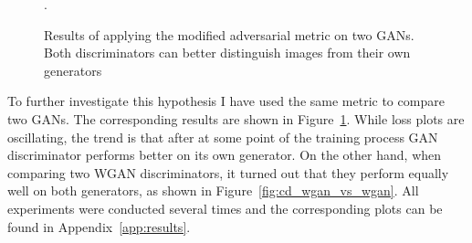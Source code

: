 \begin{figure}[h!]
\begin{subfigure}[b]{0.5\textwidth}
	\end{subfigure}
	\caption{Results of applying the modified adversarial metric on two GANs. Both discriminators can better distinguish images from their own generators}.
	\label{fig:cd_gan_vs_gan}
\end{figure}

To further investigate this hypothesis I have used the same metric to compare two GANs. The corresponding results are shown in Figure~\ref{fig:cd_gan_vs_gan}. While loss plots are oscillating, the trend is that after at some point of the training process GAN discriminator performs better on its own generator. On the other hand, when comparing two WGAN discriminators, it turned out that they perform equally well on both generators, as shown in Figure~\ref{fig:cd_wgan_vs_wgan}. All experiments were conducted several times and the corresponding plots can be found in Appendix~\ref{app:results}.
